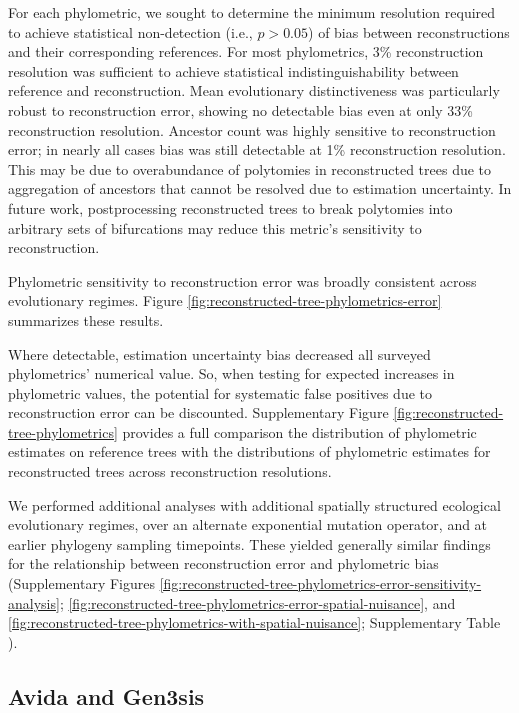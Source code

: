 For each phylometric, we sought to determine the minimum resolution required to achieve statistical non-detection (i.e., $p > 0.05$) of bias between reconstructions and their corresponding references.
For most phylometrics, 3\% reconstruction resolution was sufficient to achieve statistical indistinguishability between reference and reconstruction.
Mean evolutionary distinctiveness was particularly robust to reconstruction error, showing no detectable bias even at only 33\% reconstruction resolution.
Ancestor count was highly sensitive to reconstruction error; in nearly all cases bias was still detectable at 1\% reconstruction resolution.
This may be due to overabundance of polytomies in reconstructed trees due to aggregation of ancestors that cannot be resolved due to estimation uncertainty.
In future work, postprocessing reconstructed trees to break polytomies into arbitrary sets of bifurcations may reduce this metric's sensitivity to reconstruction.

Phylometric sensitivity to reconstruction error was broadly consistent across evolutionary regimes.
Figure \ref{fig:reconstructed-tree-phylometrics-error} summarizes these results.

Where detectable, estimation uncertainty bias decreased all surveyed phylometrics' numerical value.
So, when testing for expected increases in phylometric values, the potential for systematic false positives due to reconstruction error can be discounted.
Supplementary Figure \ref{fig:reconstructed-tree-phylometrics} provides a full comparison the distribution of phylometric estimates on reference trees with the distributions of phylometric estimates for reconstructed trees across reconstruction resolutions.

We performed additional analyses with additional spatially structured ecological evolutionary regimes, over an alternate exponential mutation operator, and at earlier phylogeny sampling timepoints.
These yielded generally similar findings for the relationship between reconstruction error and phylometric bias (Supplementary Figures \ref{fig:reconstructed-tree-phylometrics-error-sensitivity-analysis}; \ref{fig:reconstructed-tree-phylometrics-error-spatial-nuisance}, and \ref{fig:reconstructed-tree-phylometrics-with-spatial-nuisance}; Supplementary Table ).

\subsection{Avida and Gen3sis}


